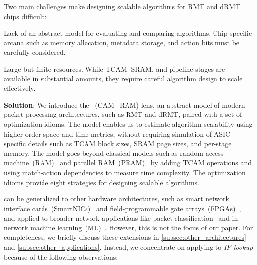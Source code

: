 Two main challenges make designing scalable algorithms for RMT and dRMT chips difficult:
\begin{inlist}
  \item Lack of an abstract model for evaluating and comparing algorithms. Chip-specific arcana such as memory allocation, metadata storage, and action bits must be carefully considered.
  \item Large but finite resources. While TCAM, SRAM, and pipeline stages are available in substantial amounts, they require careful algorithm design to scale effectively.
\end{inlist}

\textbf{Solution}: We introduce the \cram~(CAM+RAM) lens, an abstract model of modern packet processing architectures, such as RMT and dRMT, paired with a set of optimization idioms. The \cram model enables us to estimate algorithm scalability using higher-order space and time metrics, without requiring simulation of ASIC-specific details such as TCAM block sizes, SRAM page sizes, and per-stage memory. The \cram model goes beyond classical models such as random-access machine~(RAM)~\cite{ram} and parallel RAM~(PRAM)~\cite{pram} by adding TCAM operations and using match-action dependencies to measure time complexity. The optimization idioms provide eight strategies for designing scalable algorithms.

\cram can be generalized to other hardware architectures, such as %
smart network interface cards~(SmartNICs)~\cite{intel_ipu, amd_pensando, nvidia_bluefield} and field-programmable gate arrays~(FPGAs)~\cite{intel_fpga, amd_fpga}, and applied to broader network applications like packet classification~\cite{pkt_class_surv1, pkt_class_surv2, pkt_class_surv3} and in-network machine learning~(ML)~\cite{homunculus, planter, inml_survey}. However, this is not the focus of our paper. For completeness, we briefly discuss these extensions in \cref{subsec:other_architectures} and \cref{subsec:other_applications}. Instead, we concentrate on applying \cram to {\em IP lookup} because of the following observations:

